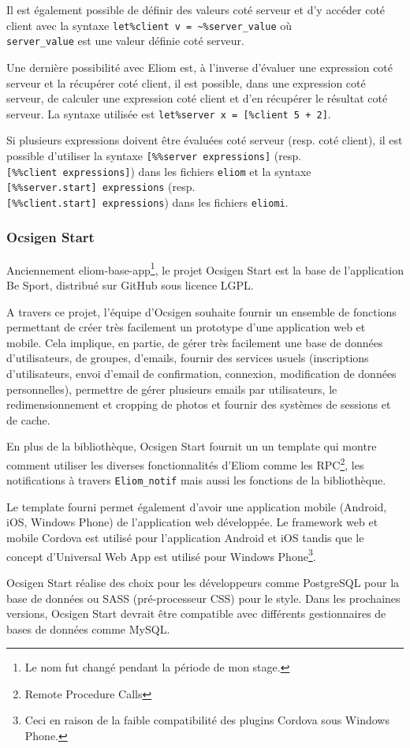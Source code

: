 Il est également possible de définir des valeurs coté serveur et d'y accéder
coté client avec la syntaxe \verb|let%client v = ~%server_value| où \\
\verb|server_value| est une valeur définie coté serveur.

Une dernière possibilité avec Eliom est, à l'inverse d'évaluer une expression
coté serveur et la récupérer coté client, il est possible, dans une expression
coté serveur, de calculer une expression coté client et d'en récupérer le
résultat coté serveur.
La syntaxe utilisée est \verb|let%server x = [%client 5 + 2]|.

Si plusieurs expressions doivent être évaluées coté serveur (resp. coté client),
il est possible d'utiliser la syntaxe \verb|[%%server expressions]| (resp. \\
\verb|[%%client expressions]|) dans les fichiers \verb|eliom| et la syntaxe \\
\verb|[%%server.start] expressions| (resp. \\ \verb|[%%client.start] expressions|)
dans les fichiers \verb|eliomi|.

\subsubsection{Ocsigen Start}

Anciennement eliom-base-app\footnote{Le nom fut changé pendant la période de
  mon stage.}, le projet Ocsigen Start\cite{ocsigen-start-github} est la base de
l'application Be Sport, distribué sur GitHub sous licence LGPL.

A travers ce projet, l'équipe d'Ocsigen souhaite fournir un ensemble de
fonctions permettant de créer très facilement un prototype d'une application web
et mobile. Cela implique, en partie, de gérer très facilement une base de
données d'utilisateurs, de groupes, d'emails, fournir des services usuels
(inscriptions d'utilisateurs, envoi d'email de confirmation, connexion,
modification de données personnelles), permettre de gérer plusieurs emails par
utilisateurs, le redimensionnement et cropping de photos et fournir des systèmes
de sessions et de cache.

En plus de la bibliothèque, Ocsigen Start fournit un un template qui montre
comment utiliser les diverses fonctionnalités d'Eliom comme les
RPC\footnote{Remote Procedure Calls}, les notifications à travers
\verb|Eliom_notif| mais aussi les fonctions de la bibliothèque.

Le template fourni permet également d'avoir une application mobile (Android,
iOS, Windows Phone) de l'application web développée. Le framework web et mobile
Cordova est utilisé pour l'application Android et iOS tandis que le concept
d'Universal Web App est utilisé pour Windows Phone\footnote{Ceci en raison de
  la faible compatibilité des plugins Cordova sous Windows Phone.}.

Ocsigen Start réalise des choix pour les développeurs comme PostgreSQL pour la
base de données ou SASS (pré-processeur CSS) pour le style.
Dans les prochaines versions, Ocsigen Start devrait être compatible avec
différents gestionnaires de bases de données comme MySQL.